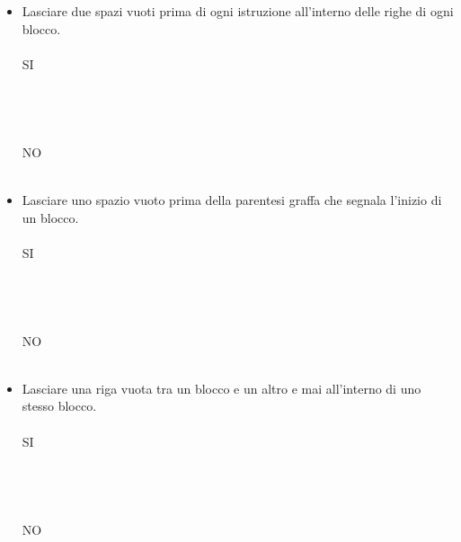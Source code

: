\begin{itemize}
{{      \}}}
    \item Lasciare due spazi vuoti prima di ogni istruzione all'interno delle righe di ogni blocco.\\ \\
    SI\\ \\ \\ \\ \\
    NO\\ \\ 
    \item Lasciare uno spazio vuoto prima della parentesi graffa che segnala l'inizio di un blocco.\\ \\
    SI\\ \\ \\ \\ \\
    NO\\ \\ 
    \item Lasciare una riga vuota tra un blocco e un altro e mai all'interno di uno stesso blocco.\\ \\
    SI\\ \\ \\ \\ \\
    NO\\ \\ 
\end{itemize}
